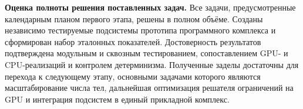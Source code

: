 \textbf{Оценка полноты решения поставленных задач.} Все задачи, предусмотренные
календарным планом первого этапа, решены в полном объёме. Созданы независимо
тестируемые подсистемы прототипа программного комплекса и сформирован набор
эталонных показателей. Достоверность результатов подтверждена модульным и
сквозным тестированием, сопоставлением GPU- и CPU-реализаций и контролем
детерминизма. Полученные заделы достаточны для перехода к следующему этапу,
основными задачами которого являются масштабирование числа тел, дальнейшая
оптимизация решателя ограничений на GPU и интеграция подсистем в единый
прикладной комплекс.
